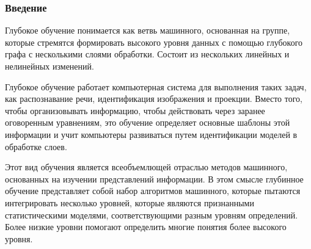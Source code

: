 \begin{frame}
    \frametitle{Введение}

    Глубокое обучение понимается как ветвь машинного, основанная на группе,
    которые стремятся формировать высокого уровня данных с помощью глубокого графа с несколькими слоями обработки. 
    Состоит из нескольких линейных и нелинейных изменений.

    Глубокое обучение работает компьютерная система для выполнения таких задач,
    как распознавание речи, идентификация изображения и проекции.
    Вместо того, чтобы организовывать информацию, чтобы действовать через заранее оговоренным уравнениям,
    это обучение определяет основные шаблоны этой информации и
    учит компьютеры развиваться путем идентификации моделей в обработке слоев.

    Этот вид обучения является всеобъемлющей отраслью методов машинного,
    основанных на изучении представлений информации.
    В этом смысле глубинное обучение представляет собой набор алгоритмов машинного,
    которые пытаются интегрировать несколько уровней,
    которые являются признанными статистическими моделями,
    соответствующими разным уровням определений.
    Более низкие уровни помогают определить многие понятия более высокого уровня.

    
\end{frame}